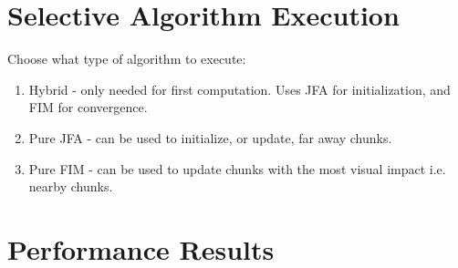 \begin{table}[h]
    \centering
    \caption{Distance field compute shader execution time using hybrid JFA and FIM approach. Compared against a pure
        FIM execution.}
\end{table}

\section{Selective Algorithm Execution}
Choose what type of algorithm to execute:

\begin{enumerate}
    \item Hybrid - only needed for first computation. Uses JFA for initialization, and FIM for convergence.
    \item Pure JFA - can be used to initialize, or update, far away chunks.
    \item Pure FIM - can be used to update chunks with the most visual impact i.e. nearby chunks.
\end{enumerate}

\section{Performance Results}

